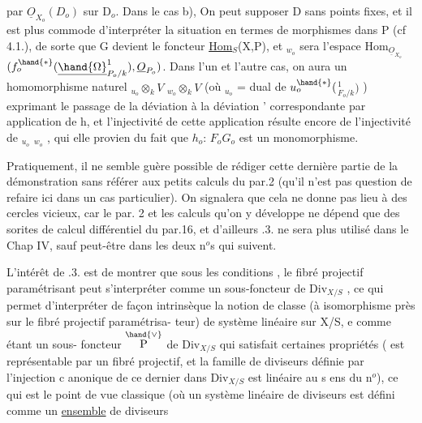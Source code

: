 
par $\underline{O}_{X_o}(D_o)$ sur D$_o$. Dans le cas b), On peut supposer D sans points
fixes, et il est plus commode d'interpréter la situation en termes de
morphismes dans P (cf 4.1.), de sorte que G devient le foncteur
\underline{Hom}$_S$(X,P), et $_{w_o}$ sera l'espace  Hom$_{\underline{O}_{X_o}}$$(f_o^{\hand{*}}(\underline{\hand{\Omega}}^{1}_{P_o/k}), \underline{O}_{P_o})$.
Dans l'un et l'autre cas, on aura un homomorphisme naturel
$_{u_o}\otimes_k V$ \hand{$\to$} $_{w_o}\otimes_k V$ (où $_{u_o}$ = dual de $u_o^{\hand{*}}($\hand{$\Omega$}$^{1}_{F_o/k})$ ) exprimant le passage
de la déviation \hand{$\delta$} à la déviation \hand{$\delta$}' correspondante par application de h,
et l'injectivité de cette application résulte encore de l'injectivité
de $_{u_o}$\hand{$\to$} $_{w_o}$ , qui elle provien du fait que $h_o$: $F_o$\hand{$\to$}$G_o$ est un
monomorphisme.
\margin{$/$}

Pratiquement, il ne semble guère possible de rédiger cette dernière
partie de la démonstration sans référer aux petits calculs du par.2
(qu'il n'est pas question de refaire ici dans un cas particulier). On
signalera que cela ne donne pas lieu à des cercles vicieux, car le par.
2  et les calculs qu'on y  développe ne dépend que des sorites
de calcul différentiel du par.16, et d'ailleurs .3. ne sera plus
utilisé dans le Chap IV, sauf peut-être dans les deux n$^{o}$s qui suivent.

L'intérêt de .3. est de montrer que sous les conditions ,
le fibré projectif paramétrisant peut s'interpréter comme un sous-foncteur
de Div$_{X/S}$ , ce qui permet d'interpréter de façon intrinsèque la notion
de classe (à isomorphisme près sur le  fibré projectif paramétrisa-%
teur) de système linéaire sur X/S, e comme étant un sous-
foncteur $\overset{\hand{\vee}}{\text{P}}$ de Div$_{X/S}$ qui satisfait certaines propriétés ( est
représentable par un fibré projectif, et la famille de diviseurs définie
par l'injection c anonique de ce dernier dans Div$_{X/S}$ est linéaire au s ens
du n$^{o}$), ce qui est  le point de vue classique (où un
système linéaire de diviseurs est défini comme un \uline{ensemble} de diviseurs


